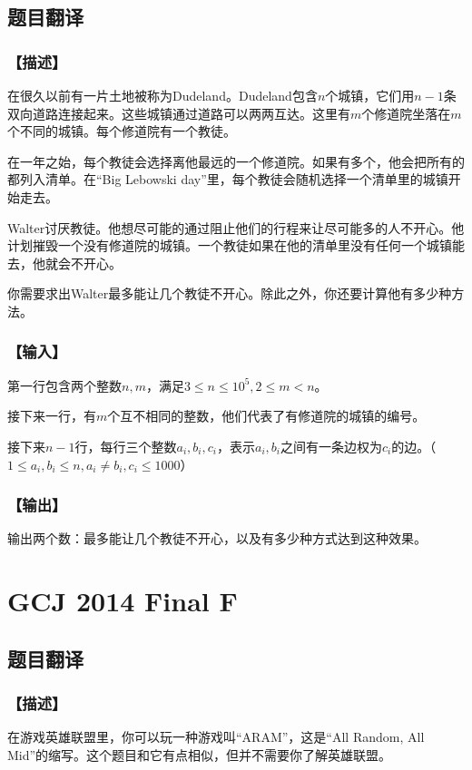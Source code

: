 \documentclass{ctexart}
\begin{document}
		\subsection{题目翻译}
			\subsubsection{【描述】}
				在很久以前有一片土地被称为Dudeland。Dudeland包含$n$个城镇，它们用$n-1$条双向道路连接起来。这些城镇通过道路可以两两互达。这里有$m$个修道院坐落在$m$个不同的城镇。每个修道院有一个教徒。

				在一年之始，每个教徒会选择离他最远的一个修道院。如果有多个，他会把所有的都列入清单。在``Big Lebowski day''里，每个教徒会随机选择一个清单里的城镇开始走去。

				Walter讨厌教徒。他想尽可能的通过阻止他们的行程来让尽可能多的人不开心。他计划摧毁一个没有修道院的城镇。一个教徒如果在他的清单里没有任何一个城镇能去，他就会不开心。

				你需要求出Walter最多能让几个教徒不开心。除此之外，你还要计算他有多少种方法。
			\subsubsection{【输入】}
				第一行包含两个整数$n,m$，满足$3 \le n \le 10^5,2 \le m <n$。

				接下来一行，有$m$个互不相同的整数，他们代表了有修道院的城镇的编号。

				接下来$n-1$行，每行三个整数$a_i,b_i,c_i$，表示$a_i,b_i$之间有一条边权为$c_i$的边。（$1 \le a_i,b_i \le n,a_i \not = b_i,c_i \le 1000$）

			\subsubsection{【输出】}
				输出两个数：最多能让几个教徒不开心，以及有多少种方式达到这种效果。
	\newpage
	\section{GCJ 2014 Final F}
		\subsection{题目翻译}
			\subsubsection{【描述】}
				在游戏英雄联盟里，你可以玩一种游戏叫``ARAM''，这是``All Random, All Mid''的缩写。这个题目和它有点相似，但并不需要你了解英雄联盟。
\end{document}
